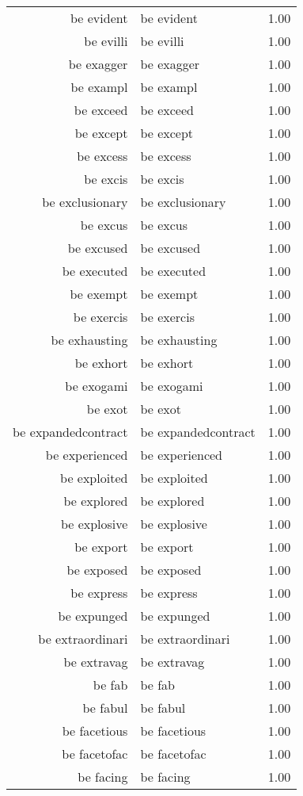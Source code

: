 \begin{table}[ht]
\begin{tabular}{rlr}
  be evident & be evident & 1.00 \\ 
  be evilli & be evilli & 1.00 \\ 
  be exagger & be exagger & 1.00 \\ 
  be exampl & be exampl & 1.00 \\ 
  be exceed & be exceed & 1.00 \\ 
  be except & be except & 1.00 \\ 
  be excess & be excess & 1.00 \\ 
  be excis & be excis & 1.00 \\ 
  be exclusionary & be exclusionary & 1.00 \\ 
  be excus & be excus & 1.00 \\ 
  be excused & be excused & 1.00 \\ 
  be executed & be executed & 1.00 \\ 
  be exempt & be exempt & 1.00 \\ 
  be exercis & be exercis & 1.00 \\ 
  be exhausting & be exhausting & 1.00 \\ 
  be exhort & be exhort & 1.00 \\ 
  be exogami & be exogami & 1.00 \\ 
  be exot & be exot & 1.00 \\ 
  be expandedcontract & be expandedcontract & 1.00 \\ 
  be experienced & be experienced & 1.00 \\ 
  be exploited & be exploited & 1.00 \\ 
  be explored & be explored & 1.00 \\ 
  be explosive & be explosive & 1.00 \\ 
  be export & be export & 1.00 \\ 
  be exposed & be exposed & 1.00 \\ 
  be express & be express & 1.00 \\ 
  be expunged & be expunged & 1.00 \\ 
  be extraordinari & be extraordinari & 1.00 \\ 
  be extravag & be extravag & 1.00 \\ 
  be fab & be fab & 1.00 \\ 
  be fabul & be fabul & 1.00 \\ 
  be facetious & be facetious & 1.00 \\ 
  be facetofac & be facetofac & 1.00 \\ 
  be facing & be facing & 1.00 \\ 

\end{tabular}
\end{table}
